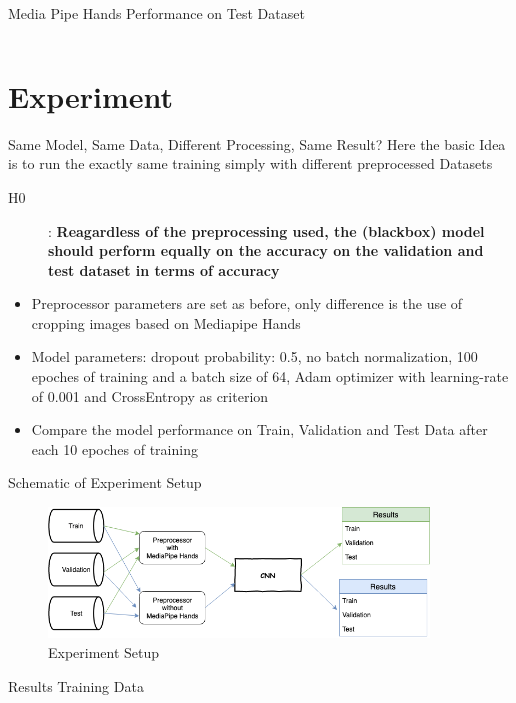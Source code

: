 \documentclass[aspectratio=169]{beamer}
\newcommand{\pop}[1]{{\color{niceorange}\textbf{#1}}}
\begin{document}
{\begin{frame}{Media Pipe Hands Performance on Test Dataset}
\begin{columns}[c]
\end{columns}
\end{frame}

\section{Experiment}
	\begin{frame}{Same Model, Same Data, Different Processing, Same Result?}
	Here the basic Idea is to run the exactly same training simply with different preprocessed Datasets
	\begin{description}
    \item[H0]: \pop{Reagardless of the preprocessing used, the (blackbox) model should perform equally on the accuracy on the validation and test dataset in terms of accuracy }
	 \end{description}  
	 \begin{itemize}
		\item Preprocessor parameters are set as before, only difference is the use of cropping images based on Mediapipe Hands
		\item Model parameters: dropout probability: 0.5, no batch normalization, 100 epoches of training and a batch size of 64, Adam optimizer with learning-rate of 0.001 and CrossEntropy as criterion
		\item Compare the model performance on Train, Validation and Test Data after each 10 epoches of training
	\end{itemize}
	\end{frame}
	
	\begin{frame}{Schematic of Experiment Setup}
	\begin{figure}
        \centering
        \includegraphics[width=0.9\textwidth]{img/experiment/Experiment_Setup.png}
        \caption{Experiment Setup}
    \end{figure}
	\end{frame}
	
	\begin{frame}{Results Training Data}
		\begin{columns}


\end{columns}
\end{frame}}
\end{document}
